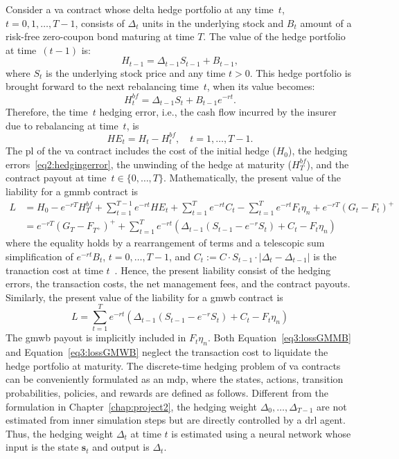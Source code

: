 Consider a \gls{va} contract whose delta hedge portfolio at any time~$t$, $t=0,1,\ldots,T-1$, consists of $\Delta_t$ units in the underlying stock and $B_t$ amount of a risk-free zero-coupon bond maturing at time $T$.
The value of the hedge portfolio at time~$(t-1)$ is:
\begin{equation*}
    H_{t-1} = \Delta_{t-1} S_{t-1} + B_{t-1},
\end{equation*}
where $S_t$ is the underlying stock price and any time $t>0$.
This hedge portfolio is brought forward to the next rebalancing time~$t$, when its value becomes:
\begin{equation*}
    H_{t}^{bf} = \Delta_{t-1} S_{t} + B_{t-1}e^{-rt}.
\end{equation*}
Therefore, the time~$t$ hedging error, i.e., the cash flow incurred by the insurer due to rebalancing at time~$t$, is
\begin{equation}
    HE_t = H_t - H^{bf}_t, \quad t=1,\ldots, T-1.
\end{equation}
The \gls{pl} of the \gls{va} contract includes the cost of the initial hedge ($H_0$), the hedging errors~\eqref{eq2:hedgingerror}, the unwinding of the hedge at maturity ($H^{bf}_T$), and the contract payout at time~$t\in \{0,\ldots,T\}$.
Mathematically, the present value of the liability for a \gls{gmmb} contract is 
\begin{align} \label{eq3:lossGMMB}
L   & = H_0 - e^{-rT} H^{bf}_T + \sum_{t=1}^{T-1} e^{-rt} HE_t + \sum_{t=1}^T e^{-rt} C_t - \sum_{t=1}^T e^{-rt} F_t\eta_n + e^{-rT} (G_t - F_t)^+  \nonumber \\ 
    & = e^{-rT} (G_T - F_{T^+})^+ + \sum_{t=1}^T e^{-rt}  \left( \Delta_{t-1} (S_{t-1} - e^{-r} S_t) + C_t - F_t\eta_n \right) 
\end{align}
where the equality holds by a rearrangement of terms and a telescopic sum simplification of $e^{-rt}B_t$, $t=0,\ldots,T-1$, and $C_t := C \cdot S_{t-1} \cdot |\Delta_t - \Delta_{t-1}|$ is the tranaction cost at time $t$~\citep{garleanu2013dynamic}.
Hence, the present liability consist of the hedging errors, the transaction costs, the net management fees, and the contract payouts.
Similarly, the present value of the liability for a \gls{gmwb} contract is
\begin{equation} \label{eq3:lossGMWB}
L = \sum_{t=1}^T e^{-rt}  \left( \Delta_{t-1} (S_{t-1} - e^{-r} S_t) + C_t - F_t\eta_n \right)
\end{equation}
The \gls{gmwb} payout is implicitly included in $F_t\eta_n$.
Both Equation~\eqref{eq3:lossGMMB} and Equation~\eqref{eq3:lossGMWB} neglect the transaction cost to liquidate the hedge portfolio at maturity.
The discrete-time hedging problem of \gls{va} contracts can be conveniently formulated as an \gls{mdp}, where the states, actions, transition probabilities, policies, and rewards are defined as follows.
Different from the formulation in Chapter~\ref{chap:project2}, the hedging weight $\Delta_0, \ldots, \Delta_{T-1}$ are not estimated from inner simulation steps but are directly controlled by a \gls{drl} agent.
Thus, the hedging weight $\Delta_t$ at time $t$ is estimated using a neural network whose input is the state $\mathbf{s}_t$ and output is $\Delta_t$.

